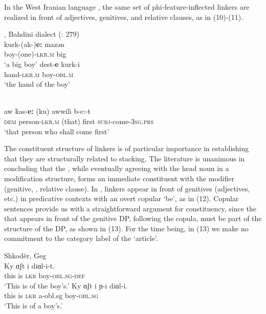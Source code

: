 \documentclass[output=paper]{langsci/langscibook}
\begin{document}
In the West Iranian language  , the same set of phi-feature-inflected linkers are realized in front of adjectives, genitives, and relative clauses, as in (10)-(11).  

\ea%
     , Bahdini dialect (\citealt{Franco2015}: 279)\label{ex:manzini:10}\\
    \ea
    \gll kurk-(ak-)\textbf{e:}     mazən    \\
         boy-(one){}-\textsc{lkr.m}    big\\
    \glt ‘a big boy’
    \ex  
    \gll dest-\textbf{e}     kurk-i\\
         hand{}-\textsc{lkr.m}    boy{}-\textsc{obl.m} \\
    \glt ‘the hand of the boy’
    \z
\z         

\ea%
      \citep[203]{McKenzie1961}\label{ex:manzini:11}\\
    \gll aw   ḱas-\textbf{e:}     (ku)   {awwil\=\i} b-e:-t\\
         \textsc{dem}   person{}-\textsc{lkr.m}   (that)  first \textsc{subj}-come-\textsc{3sg.prs}\\
    \glt ‘that person who shall come first’
\z

 The constituent structure of linkers is of particular importance in establishing that they are structurally related to stacking. The literature is unanimous in concluding that the , while eventually agreeing with the head noun in a modification structure, forms an immediate constituent with the modifier (genitive, , relative clause). In , linkers appear in front of genitives (adjectives, etc.) in predicative contexts with an overt copular ‘be’, as in (12). Copular sentences provide us with a straightforward argument for constituency, since the  that appears in front of the genitive DP, following the copula, must be part of the structure of the DP, as shown in (13). For the time being, in (13) we make no commitment to the category label of the ‘article’.

\ea%
    Shkodër, Geg \label{ex:manzini:12}\\
    \ea
    \gll Ky   ɑʃt   i   diɑl-i-t.     \\
         this  is  \textsc{lkr}  boy-\textsc{obl.sg-def}   \\
    \glt ‘This is of the boy’s.’  
    \ex
    \gll Ky   ɑʃt   i  ɲ{}-i    diɑl-i.\\
         this  is  \textsc{lkr}  a-obl.sg   boy-\textsc{obl.sg}   \\
    \glt ‘This is of a boy’s.’
    \z
\z
          
\end{document}
